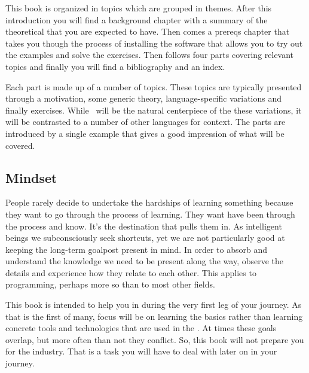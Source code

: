 This book is organized in topics which are grouped in themes. After this introduction you will find a background chapter with a summary of the theoretical that you are expected to have. Then comes a prereqs chapter that takes you though the process of installing the software that allows you to try out the examples and solve the exercises. Then follows four parts covering relevant topics and finally you will find a bibliography and an index.

Each part is made up of a number of topics. These topics are typically presented through a motivation, some generic theory, language-specific variations and finally exercises. While \csharp\ will be the natural centerpiece of the these variations, it will be contrasted to a number of other languages for context. The parts are introduced by a single example that gives a good impression of what will be covered.

\subsection{Mindset}

\begin{inspiration}{\cite{selfrel}}
\end{inspiration}

People rarely decide to undertake the hardships of learning something because they want to go through the process of learning. They want have been through the process and know. It's the destination that pulls them in. As intelligent beings we subconsciously seek shortcuts, yet we are not particularly good at keeping the long-term goalpost present in mind. In order to absorb and understand the knowledge we need to be present along the way, observe the details and experience how they relate to each other. This applies to programming, perhaps more so than to most other fields.

This book is intended to help you in during the very first leg of your journey. As that is the first of many, focus will be on learning the basics rather than learning concrete tools and technologies that are used in the . At times these goals overlap, but more often than not they conflict. So, this book will not prepare you for the industry. That is a task you will have to deal with later on in your journey.

